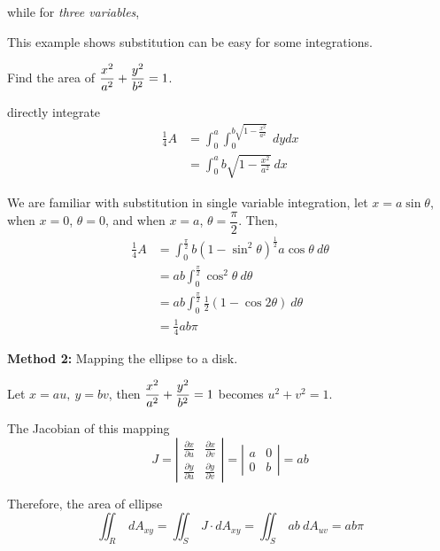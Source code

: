 \begin{spacing}{1.3}
    while for {\it three variables}, 
    \begin{center}
    \end{center}

    \newpage
    {\blue This example shows substitution can be easy for some integrations.}

    \eg Find the area of $\displaystyle \frac{x^2}{a^2}+\frac{y^2}{b^2}=1$.

     directly integrate 
    \begin{align*}
        \frac{1}{4}A &= \int_{0}^{a} \int_{0}^{b\sqrt{1-\frac{x^2}{a^2}}}\ dydx\\
         &= \int_0^a b\sqrt{1-\frac{x^2}{a^2}}\ dx
    \end{align*}

    We are familiar with substitution in single variable integration, let $x=a\sin\theta$,
    when $x=0$, $\theta=0$, and when $x=a$, $\theta=\dfrac{\pi}{2}$. Then,
    \begin{align*}
        \frac{1}{4}A &= \int_0^{\frac{\pi}{2}} b(1-\sin^2\theta)^{\frac{1}{2}} a\cos\theta\ d\theta \\ 
        &= ab\int_0^{\frac{\pi}{2}} \cos^2\theta\ d\theta\\
        &= ab\int_0^{\frac{\pi}{2}} \frac{1}{2}(1-\cos2\theta)\ d\theta\\
        &= \frac{1}{4}ab\pi
    \end{align*}

    {\bf Method 2:} Mapping the ellipse to a disk.

    Let $x=au,\ y=bv$, then $\displaystyle \frac{x^2}{a^2}+\frac{y^2}{b^2}=1$ becomes $u^2+v^2=1$.

    The Jacobian of this mapping 
    $$J=\left|\begin{array}{ll}\frac{\partial x}{\partial u} & \frac{\partial x}{\partial v} \\ \frac{\partial y}{\partial u} & \frac{\partial y}{\partial v}\end{array}\right|
    =\left| \begin{array}{cc}
        a & 0 \\ 0 & b
    \end{array} \right|=ab$$

    Therefore, the area of ellipse 
    $$\iint_R\ dA_{xy}=\iint_S\ J\cdot dA_{xy}=\iint_S\ ab\ dA_{uv}=ab\pi$$


\end{spacing}
